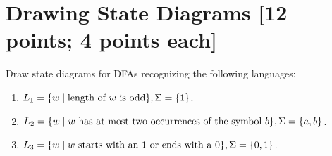 \newpage
\section{Drawing State Diagrams [12 points; 4 points each]}\label{sec:drawing}
Draw state diagrams for DFAs recognizing the following languages:
\begin{enumerate}[label=(\roman*)]
\item $L_1 = \{w \mid \text{length of \ensuremath{w} is odd}\}, \Sigma = \{1\}$.
\item $L_2 = \{w \mid \mbox{\ensuremath{w} has at most two occurrences of the symbol \ensuremath{b}}\}, \Sigma = \{a, b\}$.
\item $L_3 = \{w \mid \mbox{\ensuremath{w} starts with an \ensuremath{1} or ends with a \ensuremath{0}}\}, \Sigma = \{0, 1\}$.
\end{enumerate}